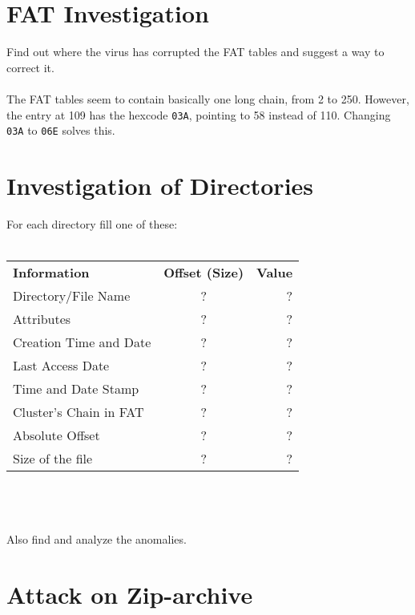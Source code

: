\documentclass{article}
\begin{document}
\section{FAT Investigation}

Find out where the virus has corrupted the FAT tables and suggest a way to correct it.\\
\\
The FAT tables seem to contain basically one long chain, from 2 to 250. However, the entry at 109 has the hexcode \texttt{03A}, pointing to 58 instead of 110. Changing \texttt{03A} to \texttt{06E} solves this.

\section{Investigation of Directories}

For each directory fill one of these:\\
\\
\begin{tabular}{l c r}
    \hline
    \textbf{Information} & \textbf{Offset (Size)} & \textbf{Value}\\
    Directory/File Name & ? & ? \\
    Attributes & ? & ? \\
    Creation Time and Date & ? & ? \\
    Last Access Date & ? & ? \\
    Time and Date Stamp & ? & ? \\
    Cluster’s Chain in FAT & ? & ? \\
    Absolute Offset & ? & ? \\
    Size of the file & ? & ? \\
    \hline
\end{tabular}
\\
\\
\\
Also find and analyze the anomalies.

\section{Attack on Zip-archive}
\end{document}
